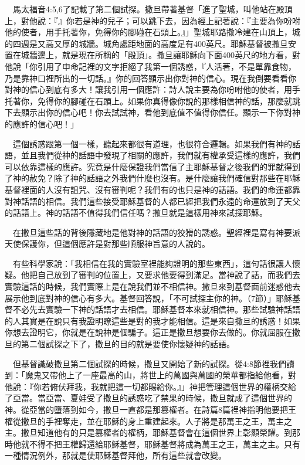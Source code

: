\documentclass{book}
\begin{document}
　馬太福音4:5,6了記載了第二個試探。撒旦帶著基督「進了聖城，叫他站在殿頂上，對他說：『』你若是神的兒子；可以跳下去，因為經上記著說：『主要為你吩咐他的使者，用手托著你，免得你的腳碰在石頭上。』」聖城耶路撒冷建在山頂上，城的四週是又高又厚的城牆。城角處距地面的高度足有400英尺。耶穌基督被撒旦安置在城牆邊上，就是現在所稱的「殿頂」。撒旦讓耶穌向下面400英尺的地方看，對他說「你引用了申命記裡的文字拒絕了我第一個誘惑，『人活著，不是單靠食物，乃是靠神口裡所出的一切話。』你的回答顯示出你對神的信心。現在我倒要看看你對神的信心到底有多大！讓我引用一個應許：詩人說主要為你吩咐他的使者，用手托著你，免得你的腳碰在石頭上。如果你真得像你說的那樣相信神的話，那麼就跳下去顯示出你的信心吧！你去試試神，看他到底值不值得你信任。顯示一下你對神的應許的信心吧！」

　這個誘惑跟第一個一樣，聽起來都很有道理，也很符合邏輯。如果我們有神的話語，並且我們從神的話語中發現了相關的應許，我們就有權承受這樣的應許，我們可以依靠這樣的應許。究竟是什麼保證我們當信了主耶穌基督之後我們的罪就得到了神的赦免？除了神的話語之外我們什麼也沒有。是什麼讓我們確信對那些在耶穌基督裡面的人沒有詛咒、沒有審判呢？我們有的也只是神的話語。我們的命運都靠對神話語的相信。我們這些接受耶穌基督的人都已經把我們永遠的命運放到了天父的話語上。神的話語不值得我們信任嗎？撒旦就是這樣用神來試探耶穌。

　在撒旦這些話的背後隱藏地是他對神的話語的狡猾的誘惑。聖經裡是寫有神要派天使保護你，但這個應許是對那些順服神旨意的人說的。

　有些科學家說：「我相信在我的實驗室裡能夠證明的那些東西」，這句話很讓人懷疑。他把自己放到了審判的位置上，又要求他要得到滿足。當神說了話，而我們去實驗這話的時候，我們實際上是在說我們並不相信神。撒旦來到基督面前迷惑他去展示他到底對神的信心有多大。基督回答說，「不可試探主你的神。（7節）」耶穌基督不必先去實驗一下神的話語才去相信。耶穌基督本來就相信神。那些試驗神話語的人其實是在說只有我證明瞭這些是對的我才能相信。這是來自撒旦的誘惑！如果你想去證明它，你就是在說神是個騙子。這正是撒旦想要你去做的。你就屈服在撒旦的第二個試探之下了，撒旦的目的就是要使你懷疑神的話語。

　但基督識破撒旦第二個試探的時候，撒旦又開始了新的試探。從4:8節裡我們讀到：「魔鬼又帶他上了一座最高的山，將世上的萬國與萬國的榮華都指給他看，對他說：『你若俯伏拜我，我就把這一切都賜給你。』」神把管理這個世界的權柄交給了亞當。當亞當、夏娃受了撒旦的誘惑吃了禁果的時候，撒旦就成了這個世界的神。從亞當的墮落到如今，撒旦一直都是那篡權者。在詩篇8篇裡神指明他要把王權從撒旦的手裡奪走，並在耶穌的身上重建起來。人子將是那萬王之王，萬主之主。撒旦知道他有的只是篡權者的權柄，耶穌基督會在這個世界上彰顯榮耀。到那時他就不得不把王權歸還給耶穌基督，耶穌基督將成為萬王之王，萬主之主。只有一種情況例外，那就是使耶穌基督拜他，所有這些就會改變。
\end{document}
